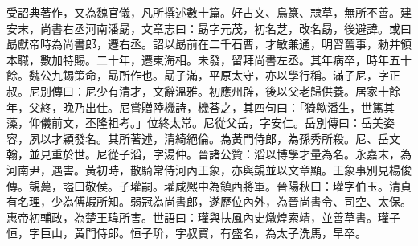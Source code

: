 \begin{pinyinscope}
受詔典著作，又為魏官儀，凡所撰述數十篇。好古文、鳥篆、隷草，無所不善。建安末，尚書右丞河南潘勗，文章志曰：勗字元茂，初名芝，改名勗，後避諱。或曰勗獻帝時為尚書郎，遷右丞。詔以勗前在二千石曹，才敏兼通，明習舊事，勑并領本職，數加特賜。二十年，遷東海相。未發，留拜尚書左丞。其年病卒，時年五十餘。魏公九錫策命，勗所作也。勗子滿，平原太守，亦以學行稱。滿子尼，字正叔。尼別傳曰：尼少有清才，文辭溫雅。初應州辟，後以父老歸供養。居家十餘年，父終，晚乃出仕。尼嘗贈陸機詩，機荅之，其四句曰：「猗歟潘生，世篤其藻，仰儀前文，丕隆祖考。」位終太常。尼從父岳，字安仁。岳別傳曰：岳美姿容，夙以才穎發名。其所著述，清綺絕倫。為黃門侍郎，為孫秀所殺。尼、岳文翰，並見重於世。尼從子滔，字湯仲。晉諸公贊：滔以博學才量為名。永嘉末，為河南尹，遇害。黃初時，散騎常侍河內王象，亦與覬並以文章顯。王象事別見楊俊傳。覬薨，謚曰敬侯。子瓘嗣。瓘咸熈中為鎮西將軍。晉陽秋曰：瓘字伯玉。清貞有名理，少為傅嘏所知。弱冠為尚書郎，遂歷位內外，為晉尚書令、司空、太保。惠帝初輔政，為楚王瑋所害。世語曰：瓘與扶風內史燉煌索靖，並善草書。瓘子恒，字巨山，黃門侍郎。恒子玠，字叔寶，有盛名，為太子洗馬，早卒。


\end{pinyinscope}